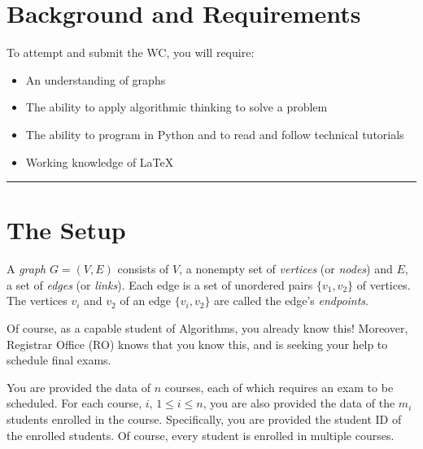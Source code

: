 \documentclass[a4paper]{exam}
\begin{document}
\section*{Background and Requirements}

To attempt and submit the WC, you will require:
\begin{itemize}
\item An understanding of graphs
\item The ability to apply algorithmic thinking to solve a problem
\item The ability to program in Python and to read and follow technical tutorials
\item Working knowledge of \LaTeX
\end{itemize}

\begin{center}
  \rule{300pt}{1pt}
  
\end{center}
\newpage
\section*{The Setup}

A \textit{graph} $G= (V, E)$ consists of $V$, a nonempty set of \textit{vertices} (or \textit{nodes}) and $E$, a set of \textit{edges} (or \textit{links}). Each edge is a set of unordered pairs $\{v_1, v_2\}$ of vertices. The vertices $v_i$ and $v_2$ of an edge $\{v_i, v_2\}$ are called the edge's \textit{endpoints}. 

Of course, as a capable student of Algorithms, you already know this! Moreover, Registrar Office (RO) knows that you know this, and is seeking your help to schedule final exams.

You are provided the data of $n$ courses, each of which requires an exam to be scheduled. For each course, $i$, $1\le i \le n$, you are also provided the data of the $m_i$ students enrolled in the course. Specifically, you are provided the student ID of the enrolled students. Of course, every student is enrolled in multiple courses.
\end{document}
